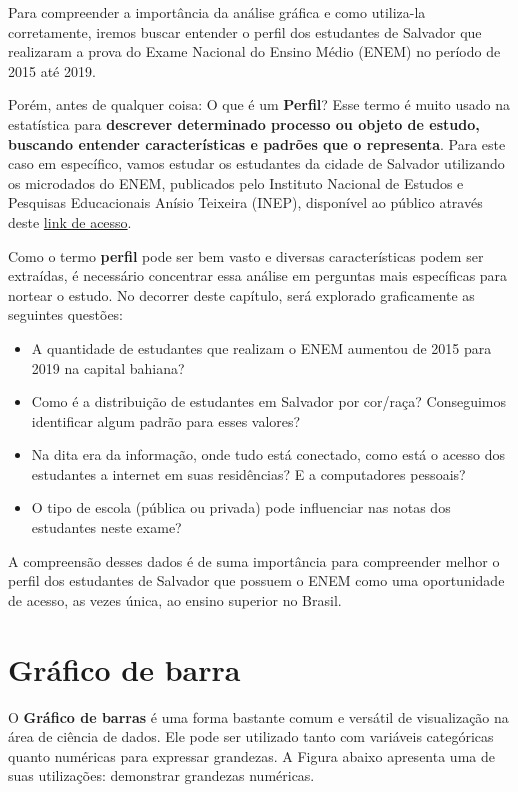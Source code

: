 \documentclass[
  oneside]{book}
\begin{document}
Para compreender a importância da análise gráfica e como utiliza-la corretamente, iremos buscar entender o perfil dos estudantes de Salvador que realizaram a prova do Exame Nacional do Ensino Médio (ENEM) no período de 2015 até 2019.

Porém, antes de qualquer coisa: O que é um \textbf{Perfil}? Esse termo é muito usado na estatística para \textbf{descrever determinado processo ou objeto de estudo, buscando entender características e padrões que o representa}. Para este caso em específico, vamos estudar os estudantes da cidade de Salvador utilizando os microdados do ENEM, publicados pelo Instituto Nacional de Estudos e Pesquisas Educacionais Anísio Teixeira (INEP), disponível ao público através deste \href{http://inep.gov.br/microdados}{link de acesso}.

Como o termo \textbf{perfil} pode ser bem vasto e diversas características podem ser extraídas, é necessário concentrar essa análise em perguntas mais específicas para nortear o estudo. No decorrer deste capítulo, será explorado graficamente as seguintes questões:

\begin{itemize}
\item
  A quantidade de estudantes que realizam o ENEM aumentou de 2015 para 2019 na capital bahiana?
\item
  Como é a distribuição de estudantes em Salvador por cor/raça? Conseguimos identificar algum padrão para esses valores?
\item
  Na dita era da informação, onde tudo está conectado, como está o acesso dos estudantes a internet em suas residências? E a computadores pessoais?
\item
  O tipo de escola (pública ou privada) pode influenciar nas notas dos estudantes neste exame?
\end{itemize}

A compreensão desses dados é de suma importância para compreender melhor o perfil dos estudantes de Salvador que possuem o ENEM como uma oportunidade de acesso, as vezes única, ao ensino superior no Brasil.

\hypertarget{gbarras}{%
\section{Gráfico de barra}\label{gbarras}}

O \textbf{Gráfico de barras} é uma forma bastante comum e versátil de visualização na área de ciência de dados. Ele pode ser utilizado tanto com variáveis categóricas quanto numéricas para expressar grandezas. A Figura abaixo apresenta uma de suas utilizações: demonstrar grandezas numéricas.
\end{document}
